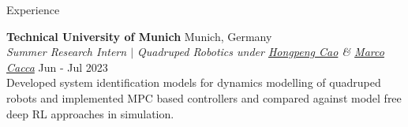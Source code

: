 \documentclass{resume}
\begin{document}
\begin{rSection}{Experience}
\vspace{0.15in}

{\bf Technical University of Munich} {\hfill Munich, Germany}\\
\textit{Summer Research Intern $|$ Quadruped Robotics under \href{https://hp-cao.github.io/hongispage/}{Hongpeng Cao} \& \href{https://rtsl.cps.mw.tum.de/personal_page/mcaccamo/}{Marco Cacca}} \hfill Jun - Jul 2023\\
Developed system identification models for dynamics modelling of quadruped robots and implemented MPC based controllers and compared against model free deep RL approaches in simulation.

\vspace{0.15in}




\end{rSection}
\end{document}
